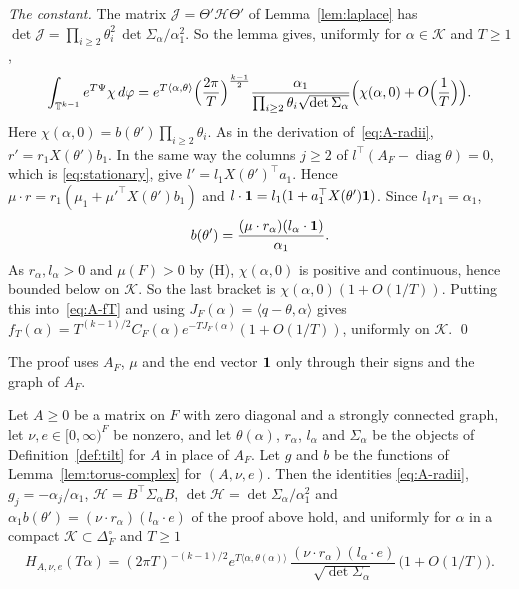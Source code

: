 \emph{The constant.} The matrix $\mathcal J=\Theta'\mathcal H\Theta'$ of
Lemma~\ref{lem:laplace} has
$\det\mathcal J=\prod_{i\ge2}\theta_i^2\,\det\Sigma_\alpha/\alpha_1^2$. So
the lemma gives, uniformly for $\alpha\in\mathcal K$ and $T\ge1$,
\[
\int_{\mathbb T^{k-1}}e^{T\Psi}\chi\,d\varphi
=e^{T\langle\alpha,\theta\rangle}\Bigl(\frac{2\pi}T\Bigr)^{\frac{k-1}2}
\frac{\alpha_1}{\prod_{i\ge2}\theta_i\sqrt{\det\Sigma_\alpha}}
\Bigl(\chi(\alpha,0)+O\Bigl(\frac1T\Bigr)\Bigr).
\]
Here $\chi(\alpha,0)=b(\theta')\prod_{i\ge2}\theta_i$. As in the derivation
of~\eqref{eq:A-radii}, $r'=r_1X(\theta')b_1$. In the same way the columns
$j\ge2$ of $l^\top(A_F-\operatorname{diag}\theta)=0$, which is
\eqref{eq:stationary}, give $l'=l_1X(\theta')^\top a_1$. Hence
$\mu\cdot r=r_1(\mu_1+\mu'^\top X(\theta')b_1)$ and
$l\cdot\mathbf{1}=l_1(1+a_1^\top X(\theta')\mathbf{1})$. Since $l_1r_1=\alpha_1$,
\[
b(\theta')=\frac{(\mu\cdot r_\alpha)(l_\alpha\cdot\mathbf{1})}{\alpha_1}.
\]
As $r_\alpha,l_\alpha>0$ and $\mu(F)>0$ by (H), $\chi(\alpha,0)$ is positive
and continuous, hence bounded below on $\mathcal K$. So the last bracket is
$\chi(\alpha,0)(1+O(1/T))$. Putting this into~\eqref{eq:A-fT} and using
$J_F(\alpha)=\langle q-\theta,\alpha\rangle$ gives
$f_T(\alpha)=T^{(k-1)/2}C_F(\alpha)e^{-TJ_F(\alpha)}(1+O(1/T))$, uniformly on
$\mathcal K$. \qed

The proof uses $A_F$, $\mu$ and the end vector $\mathbf{1}$ only through their signs and the graph of
$A_F$.

\begin{lemma}\label{lem:local-general}
Let $A\ge0$ be a matrix on $F$ with zero diagonal and a strongly connected graph, let
$\nu,e\in[0,\infty)^F$ be nonzero, and let $\theta(\alpha)$, $r_\alpha$, $l_\alpha$ and
$\Sigma_\alpha$ be the objects of Definition~\ref{def:tilt} for $A$ in place of $A_F$. Let $g$
and $b$ be the functions of Lemma~\ref{lem:torus-complex} for $(A,\nu,e)$. Then the identities
\eqref{eq:A-radii}, $g_j=-\alpha_j/\alpha_1$, $\mathcal H=B^\top\Sigma_\alpha B$,
$\det\mathcal H=\det\Sigma_\alpha/\alpha_1^2$ and
$\alpha_1b(\theta')=(\nu\cdot r_\alpha)(l_\alpha\cdot e)$ of the proof above hold, and uniformly
for $\alpha$ in a compact $\mathcal K\subset\Delta_F^\circ$ and $T\ge1$
\[
H_{A,\nu,e}(T\alpha)=(2\pi T)^{-(k-1)/2}e^{T\langle\alpha,\theta(\alpha)\rangle}\,
\frac{(\nu\cdot r_\alpha)(l_\alpha\cdot e)}{\sqrt{\det\Sigma_\alpha}}\,\bigl(1+O(1/T)\bigr).
\]
\end{lemma}

